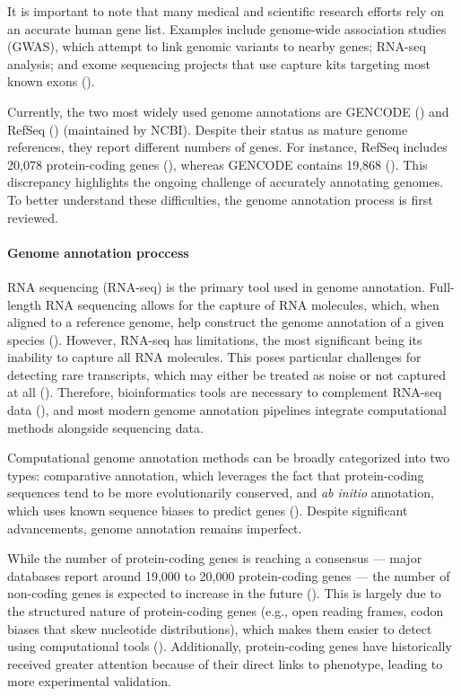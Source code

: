 It is important to note that many medical and scientific research efforts rely on an accurate human gene list.
Examples include genome-wide association studies (GWAS), which attempt to link genomic variants to nearby genes;
RNA-seq analysis; and exome sequencing projects that use capture kits targeting most known exons (\cite{Pertea2018}).

Currently, the two most widely used genome annotations are GENCODE (\cite{Mudge2024}) and RefSeq (\cite{OLeary2015}) (maintained by NCBI).
Despite their status as mature genome references, they report different numbers of genes.
For instance, RefSeq includes 20,078 protein-coding genes (\cite{ncbi}), whereas GENCODE contains 19,868 (\cite{ensembl}).
This discrepancy highlights the ongoing challenge of accurately annotating genomes.
To better understand these difficulties, the genome annotation process is first reviewed.

\paragraph{Genome annotation proccess}

RNA sequencing (RNA-seq) is the primary tool used in genome annotation.
Full-length RNA sequencing allows for the capture of RNA molecules, which, when aligned to a reference genome,
help construct the genome annotation of a given species (\cite{Salzberg2019}).
However, RNA-seq has limitations, the most significant being its inability to capture all RNA molecules.
This poses particular challenges for detecting rare transcripts, which may either be treated as noise or not captured at all (\cite{Salzberg2019}).
Therefore, bioinformatics tools are necessary to complement RNA-seq data (\cite{Guigo2023}),
and most modern genome annotation pipelines integrate computational methods alongside sequencing data.

Computational genome annotation methods can be broadly categorized into two types:
comparative annotation, which leverages the fact that protein-coding sequences tend to be more evolutionarily conserved,
and \textit{ab initio} annotation, which uses known sequence biases to predict genes (\cite{Guigo2023}).
Despite significant advancements, genome annotation remains imperfect.

While the number of protein-coding genes is reaching a consensus — major databases report around 19,000 to 20,000 protein-coding genes — 
the number of non-coding genes is expected to increase in the future (\cite{Amaral2023}).
This is largely due to the structured nature of protein-coding genes (e.g., open reading frames, codon biases that skew nucleotide distributions),
which makes them easier to detect using computational tools (\cite{Guigo2023}).
Additionally, protein-coding genes have historically received greater attention because of their direct links to phenotype,
leading to more experimental validation.

